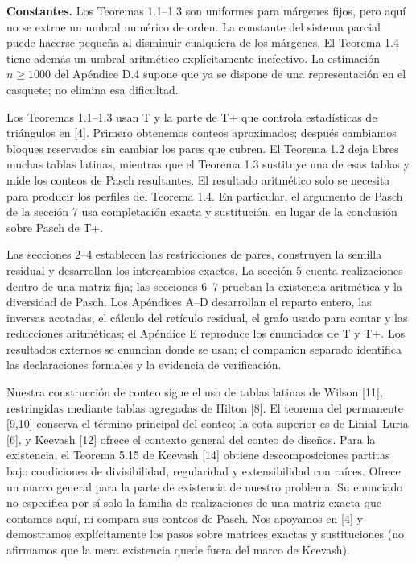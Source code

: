 \documentclass[spanish,11pt,a4paper]{article}
\begin{document}
\textbf{Constantes.} Los Teoremas 1.1--1.3 son uniformes para márgenes fijos, pero aquí no se extrae un umbral numérico de orden. La constante del sistema parcial puede hacerse pequeña al disminuir cualquiera de los márgenes. El Teorema 1.4 tiene además un umbral aritmético explícitamente inefectivo. La estimación \(n\ge1000\) del Apéndice D.4 supone que ya se dispone de una representación en el casquete; no elimina esa dificultad.

Los Teoremas 1.1--1.3 usan T y la parte de T+ que controla estadísticas de triángulos en {[}4{]}. Primero obtenemos conteos aproximados; después cambiamos bloques reservados sin cambiar los pares que cubren. El Teorema 1.2 deja libres muchas tablas latinas, mientras que el Teorema 1.3 sustituye una de esas tablas y mide los conteos de Pasch resultantes. El resultado aritmético solo se necesita para producir los perfiles del Teorema 1.4. En particular, el argumento de Pasch de la sección 7 usa completación exacta y sustitución, en lugar de la conclusión sobre Pasch de T+.

Las secciones 2--4 establecen las restricciones de pares, construyen la semilla residual y desarrollan los intercambios exactos. La sección 5 cuenta realizaciones dentro de una matriz fija; las secciones 6--7 prueban la existencia aritmética y la diversidad de Pasch. Los Apéndices A--D desarrollan el reparto entero, las inversas acotadas, el cálculo del retículo residual, el grafo usado para contar y las reducciones aritméticas; el Apéndice E reproduce los enunciados de T y T+. Los resultados externos se enuncian donde se usan; el companion separado identifica las declaraciones formales y la evidencia de verificación.

Nuestra construcción de conteo sigue el uso de tablas latinas de Wilson {[}11{]}, restringidas mediante tablas agregadas de Hilton {[}8{]}. El teorema del permanente {[}9,10{]} conserva el término principal del conteo; la cota superior es de Linial--Luria {[}6{]}, y Keevash {[}12{]} ofrece el contexto general del conteo de diseños. Para la existencia, el Teorema 5.15 de Keevash {[}14{]} obtiene descomposiciones partitas bajo condiciones de divisibilidad, regularidad y extensibilidad con raíces. Ofrece un marco general para la parte de existencia de nuestro problema. Su enunciado no especifica por sí solo la familia de realizaciones de una matriz exacta que contamos aquí, ni compara sus conteos de Pasch. Nos apoyamos en {[}4{]} y demostramos explícitamente los pasos sobre matrices exactas y sustituciones (no afirmamos que la mera existencia quede fuera del marco de Keevash).
\end{document}
